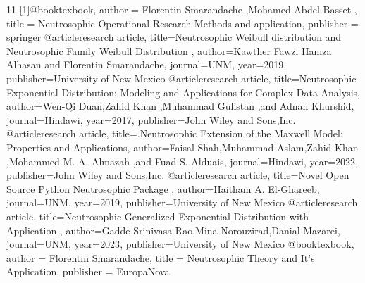 \documentclass[12pt,a4paper,oneside]{article}
\begin{document}
\begin{thebibliography}{11}
[1]\hspace{0.3cm}@book{texbook,
  author = {Florentin Smarandache ,Mohamed Abdel-Basset },
  title = {Neutrosophic Operational Research Methods and application},
  publisher = {springer}
}
\newline\newline
[2]\hspace{0.3cm}@article{research article,
  title={Neutrosophic Weibull distribution and Neutrosophic Family  
Weibull Distribution },
  author={Kawther Fawzi Hamza Alhasan and Florentin Smarandache},
  journal={UNM},
  year={2019},
  publisher={University of New Mexico}
}
\newline\newline
[3]\hspace{0.3cm}@article{research article,
  title={Neutrosophic Exponential Distribution: Modeling and Applications for Complex Data Analysis},
  author={Wen-Qi Duan,Zahid Khan
,Muhammad Gulistan
,and Adnan Khurshid},
  journal={Hindawi},
  year={2017},
  publisher={John Wiley and Sons,Inc.}
}
\newline\newline
[4]\hspace{0.3cm}@article{research article,
  title={.Neutrosophic Extension of the Maxwell Model: Properties and Applications},
  author={Faisal Shah,Muhammad Aslam,Zahid Khan
,Mohammed M. A. Almazah
,and Fuad S. Alduais},
  journal={Hindawi},
  year={2022},
  publisher={John Wiley and Sons,Inc.}
}
\newline\newline
[5]\hspace{0.3cm}@article{research article,
  title={Novel Open Source Python Neutrosophic Package },
  author={Haitham A. El-Ghareeb},
  journal={UNM},
  year={2019},
  publisher={University of New Mexico}
}
\newline\newline
[6]\hspace{0.3cm}@article{research article,
  title={Neutrosophic Generalized Exponential Distribution with Application },
  author={Gadde Srinivasa Rao,Mina Norouzirad,Danial Mazarei},
  journal={UNM},
  year={2023},
  publisher={University of New Mexico}
}
\newline\newline
[7]\hspace{0.3cm}@book{texbook,
  author = {Florentin Smarandache},
  title = {Neutrosophic Theory and It's Application},
  publisher = {EuropaNova}
}
\end{thebibliography}
\end{document}
